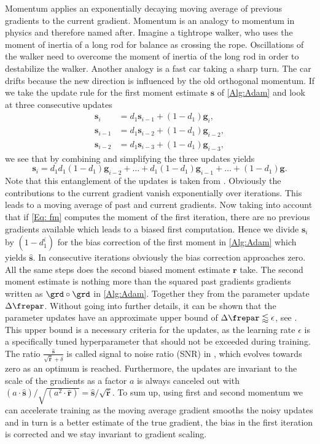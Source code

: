 Momentum applies an exponentially decaying moving average of previous gradients to the current gradient. Momentum is an analogy to momentum in physics and therefore named after. Imagine a tightrope walker, who uses the moment of inertia of a long rod for balance as crossing the rope. Oscillations of the walker need to overcome the moment of inertia of the long rod in order to destabilize the walker. Another analogy is a fast car taking a sharp turn. The car drifts because the new direction is influenced by the old orthogonal momentum. If we take the update rule for the first moment estimate \(\mathbf{s}\) of \cref{Alg:Adam} and look at three consecutive updates
\begin{align}
	\mathbf{s}_i &= d_1\mathbf{s}_{i-1}+(1-d_1)\mathbf{g}_{i}\mathrm{,} \label{Eq: fm}\\
	\mathbf{s}_{i-1}&=d_1\mathbf{s}_{i-2}+(1-d_1)\mathbf{g}_{i-2}\mathrm{,}\\
	\mathbf{s}_{i-2}&=d_1\mathbf{s}_{i-3}+(1-d_1)\mathbf{g}_{i-3}\mathrm{,}
\end{align}
we see that by combining and simplifying the three updates yields
\begin{equation}
	\mathbf{s}_i = d_1d_1(1-d_1)\mathbf{g}_{i-2}+\dots+d_1(1-d_1)\mathbf{g}_{i-1}+\dots+(1-d_1)\mathbf{g}\mathrm{.}
\end{equation}
Note that this entanglement of the updates is taken from \cite{bushaev_2017}. Obviously the contributions to the current gradient vanish exponentially over iterations. This leads to a moving average of past and current gradients. Now taking into account that if \cref{Eq: fm} computes the moment of the first iteration, there are no previous gradients available which leads to a biased first computation. Hence we divide \(\mathbf{s}_i\) by \((1-d_1^i)\) for the bias correction of the first moment in \cref{Alg:Adam} which yields \(\hat{\mathbf{s}}\). In consecutive iterations obviously the bias correction approaches zero. All the same steps does the second biased moment estimate \(\mathbf{r}\) take. The second moment estimate is nothing more than the squared past gradients gradients written as \(\grd \circ\grd\) in \cref{Alg:Adam}. Together they from the parameter update \(\Delta\frepar\). Without going into further details, it can be shown that the parameter updates have an approximate upper bound of \(\Delta\frepar\lessapprox \epsilon\), see \cite{kingma2017adam}. This upper bound is a necessary criteria for the updates, as the learning rate \(\epsilon\) is a specifically tuned hyperparameter that should not be exceeded during training. The ratio \(\frac{\hat{\mathbf{s}}}{\sqrt{\hat{\mathbf{r}}}+\delta}\) is called signal to noise ratio (SNR) in \cite{kingma2017adam}, which evolves towards zero as an optimum is reached. Furthermore, the updates are invariant to the scale of the gradients as a factor \(a\) is always canceled out with \((a\cdot\hat{\mathbf{s}})/\sqrt{(a^2\cdot\hat{\mathbf{r}})}=\hat{\mathbf{s}}/\sqrt{\hat{\mathbf{r}}}\). To sum up, using first and second momentum we can accelerate training as the moving average gradient smooths the noisy updates and in turn is a better estimate of the true gradient, the bias in the first iteration is corrected and we stay invariant to gradient scaling.\\       
